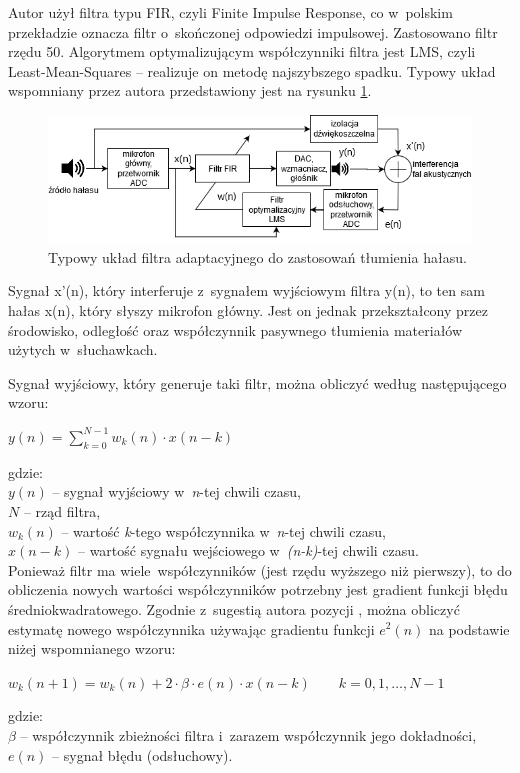 Autor użył filtra typu FIR, czyli Finite Impulse Response, co w~polskim przekładzie oznacza filtr o~skończonej odpowiedzi impulsowej. Zastosowano filtr rzędu 50. Algorytmem optymalizującym współczynniki filtra jest LMS, czyli Least-Mean-Squares -- realizuje on metodę najszybszego spadku. Typowy układ wspomniany przez autora przedstawiony jest na rysunku \ref{fig:typical_fir_lms}.
\begin{figure}[h!]
	\centering
	\includegraphics[width=\linewidth]{../Assets/typical_fir_lms.png}
	\caption{Typowy układ filtra adaptacyjnego do zastosowań tłumienia hałasu.}
	\label{fig:typical_fir_lms}
\end{figure}

Sygnał x'(n), który interferuje z~sygnałem wyjściowym filtra y(n), to ten sam hałas x(n), który słyszy mikrofon główny. Jest on jednak przekształcony przez środowisko, odległość oraz współczynnik pasywnego tłumienia materiałów użytych w~słuchawkach.

Sygnał wyjściowy, który generuje taki filtr, można obliczyć według następującego wzoru:\\
\begin{center} $ y(n) = \sum_{k=0}^{N-1} w_k(n)\cdot x(n-k) $ \end{center}
gdzie:\\
$y(n)$ -- sygnał wyjściowy w~\textit{n}-tej chwili czasu,\\
$N$ -- rząd filtra,\\
$w_k(n)$ -- wartość \textit{k}-tego współczynnika w~\textit{n}-tej chwili czasu,\\
$x(n-k)$ -- wartość sygnału wejściowego w~\textit{(n-k)}-tej chwili czasu.\\
Ponieważ filtr ma wiele~współczynników (jest rzędu wyższego niż pierwszy), to do obliczenia nowych wartości współczynników potrzebny jest gradient funkcji błędu średniokwadratowego. Zgodnie z~sugestią autora pozycji \cite{Chassaing}, można obliczyć estymatę nowego współczynnika używając gradientu funkcji $e^2(n)$ na podstawie niżej wspomnianego wzoru:\\
\begin{center} $ w_k(n+1) = w_k(n) + 2\cdot\beta\cdot e(n)\cdot x(n-k) \qquad k=0,1,\dots,N-1 $ \end{center}
gdzie:\\
$\beta$ -- współczynnik zbieżności filtra i~zarazem współczynnik jego dokładności,\\
$e(n)$ -- sygnał błędu (odsłuchowy).

